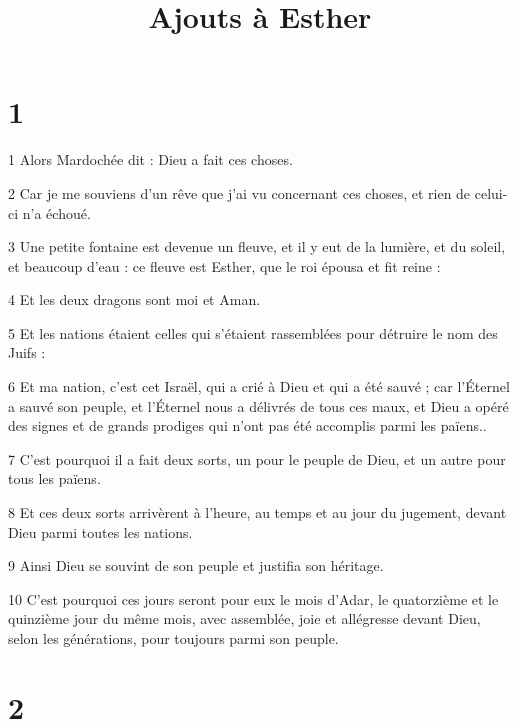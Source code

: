 

\title{Ajouts à Esther}

\chapter{1}

\par 1 Alors Mardochée dit : Dieu a fait ces choses.
\par 2 Car je me souviens d'un rêve que j'ai vu concernant ces choses, et rien de celui-ci n'a échoué.
\par 3 Une petite fontaine est devenue un fleuve, et il y eut de la lumière, et du soleil, et beaucoup d'eau : ce fleuve est Esther, que le roi épousa et fit reine :
\par 4 Et les deux dragons sont moi et Aman.
\par 5 Et les nations étaient celles qui s'étaient rassemblées pour détruire le nom des Juifs :
\par 6 Et ma nation, c'est cet Israël, qui a crié à Dieu et qui a été sauvé ; car l'Éternel a sauvé son peuple, et l'Éternel nous a délivrés de tous ces maux, et Dieu a opéré des signes et de grands prodiges qui n'ont pas été accomplis parmi les païens..
\par 7 C'est pourquoi il a fait deux sorts, un pour le peuple de Dieu, et un autre pour tous les païens.
\par 8 Et ces deux sorts arrivèrent à l'heure, au temps et au jour du jugement, devant Dieu parmi toutes les nations.
\par 9 Ainsi Dieu se souvint de son peuple et justifia son héritage.
\par 10 C'est pourquoi ces jours seront pour eux le mois d'Adar, le quatorzième et le quinzième jour du même mois, avec assemblée, joie et allégresse devant Dieu, selon les générations, pour toujours parmi son peuple.

\chapter{2}

